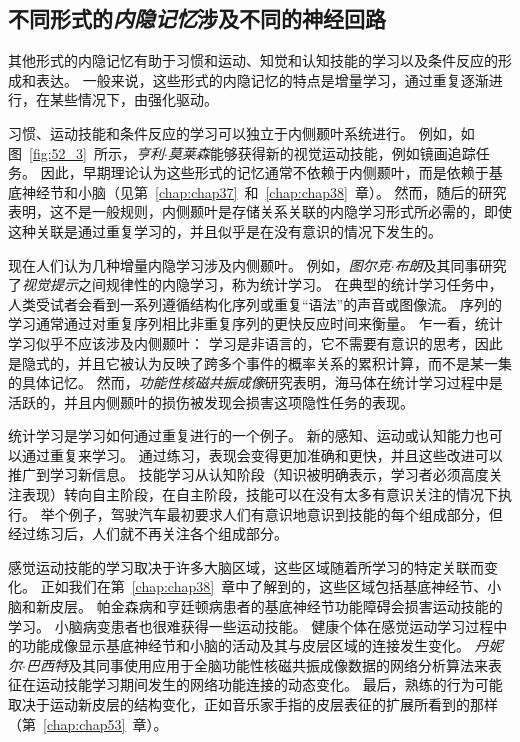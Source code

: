 \subsection{不同形式的\textit{内隐记忆}涉及不同的神经回路}

其他形式的内隐记忆有助于习惯和运动、知觉和认知技能的学习以及条件反应的形成和表达。
一般来说，这些形式的内隐记忆的特点是增量学习，通过重复逐渐进行，在某些情况下，由强化驱动。


习惯、运动技能和条件反应的学习可以独立于内侧颞叶系统进行。
例如，如图~\ref{fig:52_3}~所示，\textit{亨利$\cdot$莫莱森}能够获得新的视觉运动技能，例如镜画追踪任务。
因此，早期理论认为这些形式的记忆通常不依赖于内侧颞叶，而是依赖于基底神经节和小脑（见第~\ref{chap:chap37}~和~\ref{chap:chap38}~章）。
然而，随后的研究表明，这不是一般规则，内侧颞叶是存储关系关联的内隐学习形式所必需的，即使这种关联是通过重复学习的，并且似乎是在没有意识的情况下发生的。


现在人们认为几种增量内隐学习涉及内侧颞叶。
例如，\textit{图尔克$\cdot$布朗}及其同事研究了\textit{视觉提示}之间规律性的内隐学习，称为统计学习。
在典型的统计学习任务中，人类受试者会看到一系列遵循结构化序列或重复“语法”的声音或图像流。
序列的学习通常通过对重复序列相比非重复序列的更快反应时间来衡量。
乍一看，统计学习似乎不应该涉及内侧颞叶：
学习是非语言的，它不需要有意识的思考，因此是隐式的，并且它被认为反映了跨多个事件的概率关系的累积计算，而不是某一集的具体记忆。
然而，\textit{功能性核磁共振成像}研究表明，海马体在统计学习过程中是活跃的，并且内侧颞叶的损伤被发现会损害这项隐性任务的表现。


统计学习是学习如何通过重复进行的一个例子。
新的感知、运动或认知能力也可以通过重复来学习。
通过练习，表现会变得更加准确和更快，并且这些改进可以推广到学习新信息。
技能学习从认知阶段（知识被明确表示，学习者必须高度关注表现）转向自主阶段，在自主阶段，技能可以在没有太多有意识关注的情况下执行。
举个例子，驾驶汽车最初要求人们有意识地意识到技能的每个组成部分，但经过练习后，人们就不再关注各个组成部分。


感觉运动技能的学习取决于许多大脑区域，这些区域随着所学习的特定关联而变化。
正如我们在第~\ref{chap:chap38}~章中了解到的，这些区域包括基底神经节、小脑和新皮层。
帕金森病和亨廷顿病患者的基底神经节功能障碍会损害运动技能的学习。
小脑病变患者也很难获得一些运动技能。
健康个体在感觉运动学习过程中的功能成像显示基底神经节和小脑的活动及其与皮层区域的连接发生变化。
\textit{丹妮尔$\cdot$巴西特}及其同事使用应用于全脑功能性核磁共振成像数据的网络分析算法来表征在运动技能学习期间发生的网络功能连接的动态变化。
最后，熟练的行为可能取决于运动新皮层的结构变化，正如音乐家手指的皮层表征的扩展所看到的那样（第~\ref{chap:chap53}~章）。


